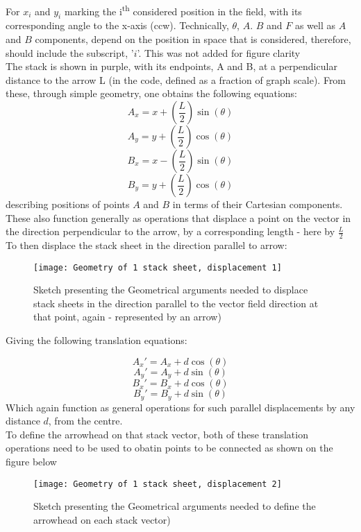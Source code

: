 \documentclass[11]{report}
\begin{document}
For \( x_i\) and \( y_i\) marking the i\textsuperscript{th} considered position in the field, with its corresponding angle to the x-axis (ccw). Technically, \( \theta\), \(A\). \(B\) and \(F\) as well as \(A\) and \(B\) components, depend on the position in space that is considered, therefore, should include the subscript, '\(i \)'. This was not added for figure clarity \\
The stack is shown in purple, with its endpoints, A and B, at a perpendicular distance to the arrow L (in the code, defined as a fraction of graph scale).
From these, through simple geometry, one obtains the following equations:
\[ A_x = x + \left( \frac{L}{2} \right) \sin( \theta) \]
\[ A_y = y + \left( \frac{L}{2} \right) \cos( \theta)\]
\[ B_x = x - \left( \frac{L}{2} \right) \sin( \theta)\]
\[ B_y = y + \left( \frac{L}{2} \right) \cos( \theta)\]
describing positions of points \(A\) and \(B\) in terms of their Cartesian components.\\
These also function generally as operations that displace a point on the vector in the direction perpendicular to the arrow, by a corresponding length - here by \( \frac{L}{2} \) \\
To then displace the stack sheet in the direction parallel to arrow:

\begin{figure}[H]
	\centering
	\graphicspath{ {c:/Users/macus/Desktop/Uni/summer internships/Moustafa - Differential Forms/images/} }
	\texttt{[image: Geometry of 1 stack sheet, displacement 1]}
	\caption{Sketch presenting the Geometrical arguments needed to displace stack sheets in the direction parallel to the 		vector field direction at that point, again - represented by an arrow)}
	\label{fig:parallel disp.}
\end{figure}
Giving the following translation equations:

\[ A_x' = A_x + d \cos(\theta) \]
\[ A_y' = A_y + d \sin(\theta) \]
\[ B_x' = B_x + d \cos(\theta) \]
\[ B_y' = B_y + d \sin(\theta) \]
Which again function as general operations for such parallel displacements by any distance \( d \), from the centre.\\

To define the arrowhead on that stack vector, both of these translation operations need to be used to obatin points to be connected as shown on the figure below

\begin{figure}[H]
	\centering
	\graphicspath{ {c:/Users/macus/Desktop/Uni/summer internships/Moustafa - Differential Forms/images/} }
	\texttt{[image: Geometry of 1 stack sheet, displacement 2]}
	\caption{Sketch presenting the Geometrical arguments needed to define the arrowhead on each stack vector)}
	\label{fig:arrowhead gometry}
\end{figure}
\end{document}
